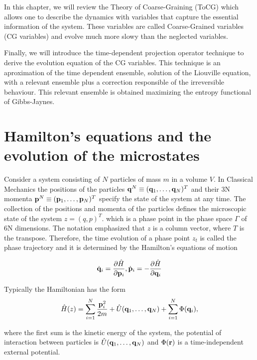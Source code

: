 \documentclass[a4paper,openright,12pt]{book}
\begin{document}
In this chapter, we will review the Theory of Coarse-Graining (ToCG) which allows one to describe the dynamics with variables that capture the essential information of the system. 
These variables are called Coarse-Grained variables (CG variables) and evolve much more slowy than the neglected variables. 

Finally, we will introduce the time-dependent projection operator technique to derive the evolution equation of the CG variables. This technique is an aproximation of the time dependent ensemble, solution of the Liouville equation, with a relevant ensemble plus a correction responsible of the irreversible behaviour. This relevant ensemble is obtained maximizing the entropy functional of Gibbs-Jaynes. 


\section{Hamilton's equations and the evolution of the microstates}
Consider a system consisting of $N$ particles of mass $m$ in a volume $V$. In Classical Mechanics the positions of the particles ${\bf q}^N\equiv ({\bf q}_1,\dots,{\bf q}_N)^T$ and their 3N momenta ${\bf p}^N\equiv ({\bf p}_1,\dots,{\bf p}_N)^T$ specify the state of the system at any time. 
The collection of the positions and momenta of the particles defines the microscopic state of the system $z=(q,p)^T$. which is a phase point in the phase space $\Gamma$ of 6N dimensions. The notation emphasized that $z$ is a column vector, where $T$ is the transpose. Therefore, the time evolution of a phase point $z_t$ is called the phase trajectory and it is determined by the Hamilton's equations of motion

\begin{equation}
    \dot{{\bf q}}_i = \frac{\partial \hat{H}}{\partial {\bf p}_i}, \dot{{\bf p}}_i = -\frac{\partial \hat{H}}{\partial {\bf q}_i}
  \label{HamiltonEqs}
\end{equation}

Typically the Hamiltonian has the form
\begin{align}
    \hat{H}(z) = \sum_{i=1}^{N}\frac{{\bf p}_i^2}{2m}+\hat{U}({\bf q}_1,\dots,{\bf q}_N)+\sum_{i=1}^{N}\Phi({\bf q}_i),
\end{align}

where the first sum is the kinetic energy of the system, the potential of interaction
between particles is $\hat{U}({\bf q}_1,\dots,{\bf q}_N)$ and $\Phi({\bf r})$ is a time-independent external potential. 
\end{document}
